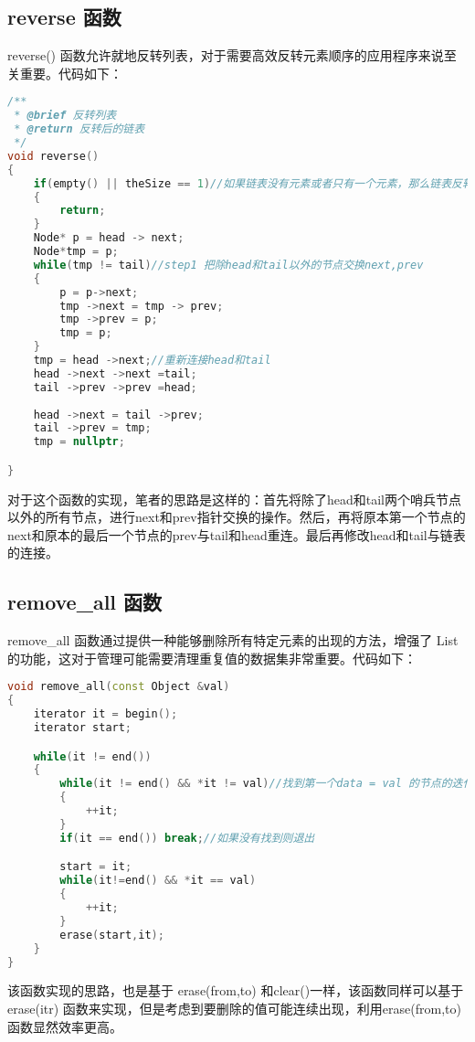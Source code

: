 \documentclass[fontset=fandol]{ctexart}
\begin{document}
\subsection{reverse 函数}  
reverse() 函数允许就地反转列表，对于需要高效反转元素顺序的应用程序来说至关重要。代码如下：

\begin{lstlisting}[language=C++, caption={reverse()函数}]  
/**
 * @brief 反转列表
 * @return 反转后的链表
 */
void reverse()
{
    if(empty() || theSize == 1)//如果链表没有元素或者只有一个元素，那么链表反转后就是它本身
    {
        return;
    }
    Node* p = head -> next;
    Node*tmp = p;
    while(tmp != tail)//step1 把除head和tail以外的节点交换next,prev
    {
        p = p->next;
        tmp ->next = tmp -> prev;
        tmp ->prev = p;
        tmp = p;
    }
    tmp = head ->next;//重新连接head和tail
    head ->next ->next =tail;
    tail ->prev ->prev =head;
         
    head ->next = tail ->prev;
    tail ->prev = tmp;  
    tmp = nullptr;     

}
\end{lstlisting}

对于这个函数的实现，笔者的思路是这样的：首先将除了head和tail两个哨兵节点以外的所有节点，进行next和prev指针交换的操作。然后，再将原本第一个节点的next和原本的最后一个节点的prev与tail和head重连。最后再修改head和tail与链表的连接。

  
\subsection{remove\_all 函数}  
remove\_all 函数通过提供一种能够删除所有特定元素的出现的方法，增强了 List 的功能，这对于管理可能需要清理重复值的数据集非常重要。代码如下：

\begin{lstlisting}[language=C++, caption={remove\_all()函数}]  
void remove_all(const Object &val)
{
    iterator it = begin();
    iterator start;

    while(it != end())
    {
        while(it != end() && *it != val)//找到第一个data = val 的节点的迭代器
        {
            ++it;
        }
        if(it == end()) break;//如果没有找到则退出

        start = it;
        while(it!=end() && *it == val)
        {
            ++it;
        }
        erase(start,it);
    }
}
\end{lstlisting}

该函数实现的思路，也是基于 erase(from,to) 和clear()一样，该函数同样可以基于  erase(itr) 函数来实现，但是考虑到要删除的值可能连续出现，利用erase(from,to) 函数显然效率更高。
\end{document}
